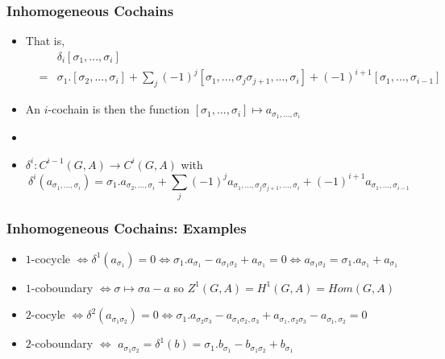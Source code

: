 \documentclass[10pt,xcolor=table,dvipsnames]{beamer}
\newenvironment{stepitemize}{\begin{itemize}[<+->]}{\end{itemize} }
\begin{document}
\begin{frame}
\frametitle{Inhomogeneous Cochains}
\begin{stepitemize}
\item[] That is,
\begin{eqnarray*}
&&\delta _{i}\left[ \sigma _{1},...,\sigma _{i}\right]  \\
&=&\sigma _{1}.\left[ \sigma _{2},...,\sigma _{i}\right] +\sum\limits_{j}%
\left( -1\right) ^{j}\left[ \sigma _{1},...,\sigma _{j}\sigma
_{j+1},...,\sigma _{i}\right] +\left( -1\right) ^{i+1}\left[ \sigma
_{1},...,\sigma _{i-1}\right]
\end{eqnarray*}

\item[] An $i$-cochain is then the function $\left[ \sigma _{1},...,\sigma _{i}%
\right] \mapsto a_{\sigma _{1},...,\sigma _{i}}$
\item[]
\item[] $\delta ^{i}:C^{i-1}\left( G,A\right) \longrightarrow C^{i}\left( G,A\right)
$ with
\begin{equation*}
\delta ^{i}\left( a_{\sigma _{1},...,\sigma _{i}}\right) =\sigma
_{1}.a_{\sigma _{2},...,\sigma _{i}}+\sum\limits_{j}\left( -1\right)
^{j}a_{\sigma _{1},...,\sigma _{j}\sigma _{j+1},...,\sigma _{i}}+\left(
-1\right) ^{i+1}a_{\sigma _{1},...,\sigma _{i-1}}
\end{equation*}

\end{stepitemize}
\end{frame}

\begin{frame}
\frametitle{Inhomogeneous Cochains: Examples}
\begin{itemize}
\item $1$-cocycle $\iff \delta ^{1}\left( a_{\sigma _{1}}\right) =0\iff \sigma
_{1}.a_{\sigma _{1}}-a_{\sigma _{1}\sigma _{2}}+a_{\sigma _{1}}=0\iff
a_{\sigma _{1}\sigma _{2}}=\sigma _{1}.a_{\sigma _{1}}+a_{\sigma _{1}}$

\item $1$-coboundary $\iff \sigma \longmapsto \sigma a-a$ so $Z^{1}\left(
G,A\right) =H^{1}\left( G,A\right) =Hom\left( G,A\right) $

\item $2$-cocyle $\iff \delta ^{2}\left( a_{\sigma _{1}\sigma _{2}}\right) =0\iff
\sigma _{1}.a_{\sigma _{2}\sigma _{3}}-a_{\sigma _{1}\sigma _{2},\sigma
_{3}}+a_{\sigma _{1},\sigma _{2}\sigma _{3}}-a_{\sigma _{1},\sigma _{2}}=0$

\item $2$-coboundary $\iff $ $a_{\sigma _{1}\sigma _{2}}=\delta ^{1}\left(
b\right) =\sigma _{1}.b_{\sigma _{1}}-b_{\sigma _{1}\sigma _{2}}+b_{\sigma
_{1}}$

\end{itemize}
\end{frame}
\end{document}
